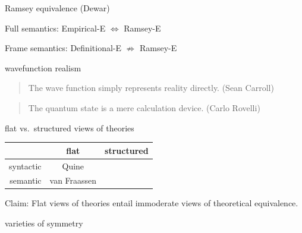 \documentclass[17pt]{beamer}
\begin{document}
\begin{frame}[fragile]{\small Ramsey equivalence (Dewar)}

  \begin{figure}
     \end{figure}

  
Full semantics: Empirical-E $\Leftrightarrow$ Ramsey-E

Frame semantics: Definitional-E $\not\Rightarrow$ Ramsey-E


\end{frame}
  

\begin{frame}{\small wavefunction realism}

  \begin{quote} The wave function simply represents reality
    directly. (Sean Carroll) \end{quote}

  \begin{quote} The quantum state is a mere calculation device. (Carlo
    Rovelli) \end{quote}
    


\end{frame}
  

\begin{frame}{\small flat vs.\ structured views of theories}

  \begin{tabular}{r | c | c |}
    & flat  & structured \\ \hline
    syntactic & Quine        & \\ \hline
    semantic  & van Fraassen & \\ \hline
  \end{tabular}

  \bigskip Claim: Flat views of theories entail immoderate views of
  theoretical equivalence.


\end{frame}


\begin{frame}{\small varieties of symmetry}

  \begin{figure}
    \centering
\end{figure}

\end{frame}
\end{document}
